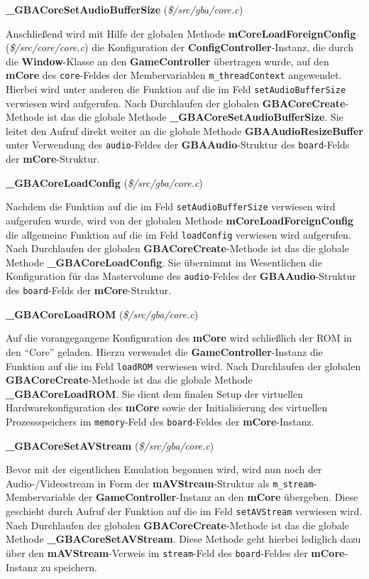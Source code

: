 \documentclass[11pt,a4paper]{scrartcl}
\newcommand{\paratitlecode}[2] {
    \vspace{5mm}
    \large \textbf{#1} \normalsize(\textit{\${#2}})
    \vspace{2mm}\newline
}
\begin{document}
\paratitlecode{{\_}GBACoreSetAudioBufferSize}{/src/gba/core.c}
Anschlie{\ss}end wird mit Hilfe der globalen Methode \textbf{mCoreLoadForeignConfig} (\textit{\$/src/core/core.c}) die Konfiguration der \textbf{ConfigController}-Instanz, die durch die \textbf{Window}-Klasse an den \textbf{GameController} \"ubertragen wurde, auf den \textbf{mCore} des \verb|core|-Feldes der Membervariablen \verb|m_threadContext| angewendet. Hierbei wird unter anderen die Funktion auf die im Feld \verb|setAudioBufferSize| verwiesen wird aufgerufen. Nach Durchlaufen der globalen \textbf{GBACoreCreate}-Methode ist das die globale Methode \textbf{{\_}GBACoreSetAudioBufferSize}. Sie leitet den Aufruf direkt weiter an die globale Methode \textbf{GBAAudioResizeBuffer} unter Verwendung des \verb|audio|-Feldes der \textbf{GBAAudio}-Struktur des \verb|board|-Felds der \textbf{mCore}-Struktur.

\paratitlecode{{\_}GBACoreLoadConfig}{/src/gba/core.c}
Nachdem die Funktion auf die im Feld \verb|setAudioBufferSize| verwiesen wird aufgerufen wurde, wird von der globalen Methode \textbf{mCoreLoadForeignConfig} die allgemeine Funktion auf die im Feld \verb|loadConfig| verwiesen wird aufgerufen. Nach Durchlaufen der globalen \textbf{GBACoreCreate}-Methode ist das die globale Methode \textbf{{\_}GBACoreLoadConfig}. Sie \"ubernimmt im Wesentlichen die Konfiguration f\"ur das Mastervolume des \verb|audio|-Feldes der \textbf{GBAAudio}-Struktur des \verb|board|-Felds der \textbf{mCore}-Struktur.

\paratitlecode{{\_}GBACoreLoadROM}{/src/gba/core.c}
Auf die vorangegangene Konfiguration des \textbf{mCore} wird schlie{\ss}lich der ROM in den \enquote{Core} geladen. Hierzu verwendet die \textbf{GameController}-Instanz die Funktion auf die im Feld \verb|loadROM| verwiesen wird. Nach Durchlaufen der globalen \textbf{GBACoreCreate}-Methode ist das die globale Methode \textbf{{\_}GBACoreLoadROM}. Sie dient dem finalen Setup der virtuellen Hardwarekonfiguration des \textbf{mCore} sowie der Initialisierung des virtuellen Prozessspeichers im \verb|memory|-Feld des \verb|board|-Feldes der \textbf{mCore}-Instanz.

\paratitlecode{{\_}GBACoreSetAVStream}{/src/gba/core.c}
Bevor mit der eigentlichen Emulation begonnen wird, wird nun noch der Audio-/Videostream in Form der \textbf{mAVStream}-Struktur als \verb|m_stream|-Membervariable der \textbf{GameController}-Instanz an den \textbf{mCore} \"ubergeben. Diese geschieht durch Aufruf der Funktion auf die im Feld \verb|setAVStream| verwiesen wird. Nach Durchlaufen der globalen \textbf{GBACoreCreate}-Methode ist das die globale Methode \textbf{{\_}GBACoreSetAVStream}. Diese Methode geht hierbei lediglich dazu \"uber den \textbf{mAVStream}-Verweis im \verb|stream|-Feld des \verb|board|-Feldes der \textbf{mCore}-Instanz zu speichern.
\end{document}
